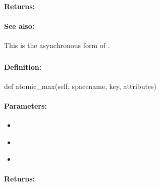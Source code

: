 \paragraph{Returns:}


\paragraph{See also:}  This is the asynchronous form of .

\pagebreak
\subsubsection{}
\label{api:python:atomic_max}


\paragraph{Definition:}
\begin{pythoncode}
def atomic_max(self, spacename, key, attributes)
\end{pythoncode}

\paragraph{Parameters:}
\begin{itemize}[noitemsep]
\item {}\\

\item {}\\

\item {}\\

\end{itemize}

\paragraph{Returns:}


\pagebreak
\subsubsection{}
\label{api:python:async_atomic_max}


